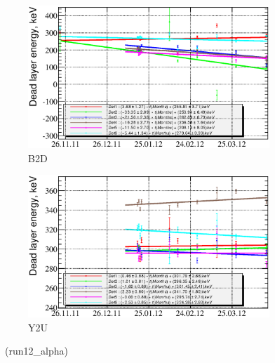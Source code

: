 \documentclass[a4paper,12pt]{article}
\begin{document}
\begin{figure}[h]
\begin{subfigure}[b]{0.5\textwidth}
\includegraphics[width=\textwidth]{gfx/run12_alpha/B2D/c_chDeadLayerEnergy_by_day_B2D.eps}
\caption{B2D}
\end{subfigure}
\begin{subfigure}[b]{0.5\textwidth}
\includegraphics[width=\textwidth]{gfx/run12_alpha/Y2U/c_chDeadLayerEnergy_by_day_Y2U.eps}
\caption{Y2U}
\end{subfigure}
\caption{\edllabellabel\ (run12\_alpha)}
\end{figure}
\end{document}
